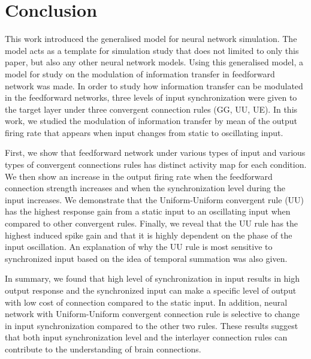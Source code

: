 \chapter{Conclusion}

This work introduced the generalised model for neural network simulation. The model acts as a template for simulation study that does not limited to only this paper, but also any other neural network models. Using this generalised model, a model for study on the modulation of information transfer in feedforward network was made. 
In order to study how information transfer can be modulated in the feedforward networks, three levels of input synchronization were given to the target layer under three convergent connection rules (GG, UU, UE). In this work, we studied the modulation of information transfer by mean of the output firing rate that appears when input changes from static to oscillating input.

First, we show that feedforward network under various types of input and various types of convergent connections rules has distinct activity map for each condition.
We then show an increase in the output firing rate when the feedforward connection strength increases and when the synchronization level during the input increases. We demonstrate that the Uniform-Uniform convergent rule (UU) has the highest response gain from a static input to an oscillating input when compared to other convergent rules. Finally, we reveal that the UU rule has the highest induced spike gain and that it is highly dependent on the phase of the input oscillation. An explanation of why the UU rule is most sensitive to synchronized input based on the idea of temporal summation was also given.

In summary, we found that high level of synchronization in input results in high output response and the synchronized input can make a specific level of output with low cost of connection compared to the static input. In addition, neural network with Uniform-Uniform convergent connection rule is selective to change in input synchronization compared to the other two rules. These results suggest that both input synchronization level and the interlayer connection rules can contribute to the understanding of brain connections. 

\paragraph{} 



